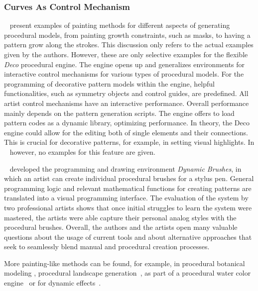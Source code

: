 \subsubsection[As Control Mechanism]{Curves As Control Mechanism}
\label{subsubsec:analysis_sketch}


\citeauthor*{mech_2012_tdf}~\cite{mech_2012_tdf} present examples of painting methods for different aspects of generating procedural models, from painting growth constraints, such as masks, to having a pattern grow along the strokes. This discussion only refers to the actual examples given by the authors. However, these are only selective examples for the flexible \textit{Deco} procedural engine. The engine opens up and generalizes environments for interactive control mechanisms for various types of procedural models. For the programming of decorative pattern models within the engine, helpful functionalities, such as symmetry objects and control guides, are predefined. All artist control mechanisms have an interactive performance. Overall performance mainly depends on the pattern generation scripts. The engine offers to load pattern codes as a dynamic library, optimizing performance. In theory, the Deco engine could allow for the editing both of single elements and their connections. This is crucial for decorative patterns, for example, in setting visual highlights. In \citeauthor*{mech_2012_tdf}~\cite{mech_2012_tdf} however, no examples for this feature are given. 

\citeauthor*{jacobs_2018_dbe}~\cite{jacobs_2018_dbe} developed the programming and drawing environment \textit{Dynamic Brushes}, in which an artist can create individual procedural brushes for a stylus pen. General programming logic and relevant mathematical functions for creating patterns are translated into a visual programming interface. The evaluation of the system by two professional artists shows that once initial struggles to learn the system were mastered, the artists were able capture their personal analog styles with the procedural brushes. Overall, the authors and the artists open many valuable questions about the usage of current tools and about alternative approaches that seek to seamlessly blend manual and procedural creation processes.

More painting-like methods can be found, for example, in procedural botanical modeling \cite{anastacio_2008_spl,chen_2008_stm,palubicki_2009_sot}, procedural landscape generation~\cite{emilien_2015_wie}, as part of a procedural water color engine~\cite{diverdi_2013_ppp} or for dynamic effects~\cite{xing_2016_eit}. 

